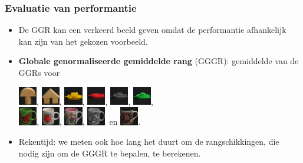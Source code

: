 \documentclass[dutch]{beamer}
\theoremstyle{definition}
\theoremstyle{remark}
\theoremstyle{example}
\begin{document}
{
  \frametitle{Evaluatie van performantie}

  \begin{itemize}
  \item De GGR kan een verkeerd beeld geven omdat de performantie afhankelijk
  kan zijn van het gekozen voorbeeld. 
  \item \textbf{Globale genormaliseerde gemiddelde rang} (GGGR): gemiddelde van
  de GGRs voor
  \begin{center}
  \vspace{5pt}
  \includegraphics[width=0.8cm]{coil/beeld-0.eps}, 
  \includegraphics[width=0.8cm]{coil/beeld-42.eps}, 
  \includegraphics[width=0.8cm]{coil/beeld-12.eps}, 
  \includegraphics[width=0.8cm]{coil/beeld-18.eps}, 
  \includegraphics[width=0.8cm]{coil/beeld-24.eps}, 
  \includegraphics[width=0.8cm]{coil/beeld-54.eps},\\
  \vspace{5pt}
  \includegraphics[width=0.8cm]{coil/beeld-30.eps}, 
  \includegraphics[width=0.8cm]{coil/beeld-36.eps}, 
  \includegraphics[width=0.8cm]{coil/beeld-6.eps}, 
  \includegraphics[width=0.8cm]{coil/beeld-48.eps}\ en  
  \includegraphics[width=0.8cm]{coil/beeld-60.eps}. 
  \end{center}
  \item Rekentijd: we meten ook hoe lang het duurt om de rangschikkingen, 
  die nodig zijn om de GGGR te bepalen, te berekenen.
  \end{itemize}
}
\end{document}
